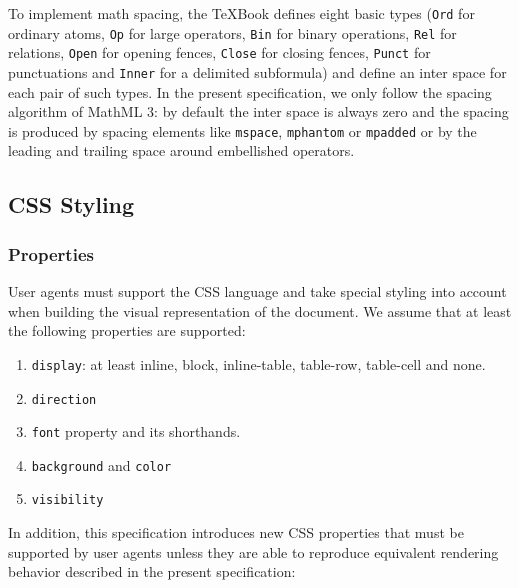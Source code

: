 To implement math spacing, the TeXBook defines eight basic types
({\tt Ord} for ordinary atoms, {\tt Op} for large operators,
{\tt Bin} for binary operations, {\tt Rel} for relations,
{\tt Open} for opening fences, {\tt Close} for closing fences,
{\tt Punct} for punctuations and {\tt Inner} for a delimited subformula) and
define an inter space for each pair of such types. In the present specification,
we only follow the spacing algorithm of MathML 3: by default the inter space
is always zero and the spacing is produced by spacing elements like
{\tt mspace}, {\tt mphantom} or {\tt mpadded} or by the leading and trailing
space around embellished operators.

\subsection{CSS Styling}

\subsubsection{Properties}

User agents must support the CSS language \cite{CSS2} and take special styling
into account when building the visual representation of the document.
We assume that at least the following properties are supported:
%
\begin{enumerate}
\item {\tt display}: at least inline, block, inline-table, table-row,
  table-cell and none.
\item {\tt direction}
\item {\tt font} property and its shorthands.
\item {\tt background} and {\tt color}
\item {\tt visibility}
\end{enumerate}

In addition, this specification introduces new CSS properties that must be
supported by user agents unless they are able to reproduce equivalent rendering
behavior described in the present specification:

